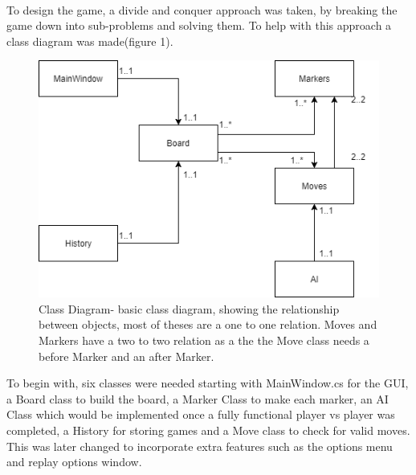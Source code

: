 \documentclass[10pt, a4paper]{article}
\begin{document}
\paragraph{}
	To design the game, a divide and conquer approach was taken, by breaking the game down into sub-problems and solving them. To help with this approach a class diagram was made(figure 1).
	\begin{figure}[H]
  	\centering
  	\includegraphics[scale = 0.4]{class-diagram}
  	\caption{Class Diagram- basic class diagram, showing the relationship between objects, most of theses are a one to one relation. Moves and Markers have a two to two relation as a the the Move class needs a before Marker and an after Marker. }
  	\label{fig:nonfloat}
	\end{figure}
To begin with, six classes were needed starting with MainWindow.cs for the GUI, a Board class to build the board, a Marker Class to make each marker, an AI Class which would be implemented once a fully functional player vs player was completed, a History for storing games and a Move class to check for valid moves. This was later changed to incorporate extra features such as the options menu and replay options window.
\end{document}
